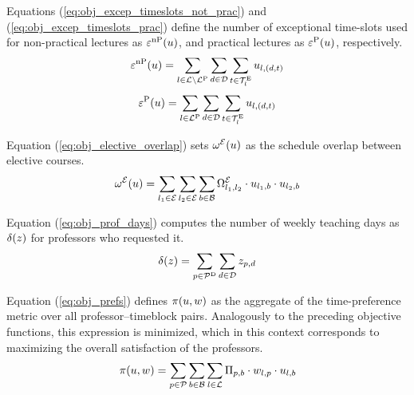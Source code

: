     Equations (\ref{eq:obj_excep_timeslots_not_prac}) and  (\ref{eq:obj_excep_timeslots_prac}) define the number of exceptional time-slots used for non-practical lectures as $\varepsilon^\text{nP}(u)$, and practical lectures as    $\varepsilon^\text{P}(u)$, respectively.
    \begin{equation}
        \varepsilon^\text{nP}(u) = \sum_{l \in \mathcal{L} \setminus \mathcal{L}^\text{P}} \sum_{d\in\mathcal{D}} \sum_{t \in \mathcal{T}^\text{E}_l} u_{l,(d,t)}
        \label{eq:obj_excep_timeslots_not_prac}
    \end{equation}
    \begin{equation}
        \varepsilon^\text{P}(u) =\sum_{l\in\mathcal{L}^\text{P}} \sum_{d\in\mathcal{D}} \sum_{t\in\mathcal{T}^\text{E}_l} u_{l,(d,t)}
        \label{eq:obj_excep_timeslots_prac}
    \end{equation}
    
    Equation (\ref{eq:obj_elective_overlap}) sets $\omega^{\mathcal{E}}(u)$ as the schedule overlap between elective courses.
    \begin{equation}
        \omega^{\mathcal{E}}(u) =\sum_{l_1\in\mathcal{E}} \sum_{l_2\in\mathcal{E}}\sum_{b\in\mathcal{B}} \Omega_{l_1,l_2}^{\mathcal{E}} \cdot u_{l_1,b} \cdot u_{l_2,b}   
        \label{eq:obj_elective_overlap}
    \end{equation}

    Equation (\ref{eq:obj_prof_days}) computes the number of weekly teaching days as $\delta(z)$ for professors who requested it.
    \begin{equation}
        \delta(z) =\sum_{p\in\mathcal{P}^\text{D}} \sum_{d\in\mathcal{D}} z_{p,d}
        \label{eq:obj_prof_days}
    \end{equation}
    
    Equation (\ref{eq:obj_prefs}) defines $\pi(u,w)$ as the aggregate of the time-preference metric over all professor–timeblock pairs. Analogously to the preceding objective functions, this expression is minimized, which in this context corresponds to maximizing the overall satisfaction of the professors.
    \begin{equation}
        \pi(u,w) = \sum_{p\in\mathcal{P}} \sum_{b\in\mathcal{B}} \sum_{l\in\mathcal{L}} \Pi_{p,b} \cdot w_{l,p} \cdot u_{l,b}
        \label{eq:obj_prefs}
    \end{equation}

        

